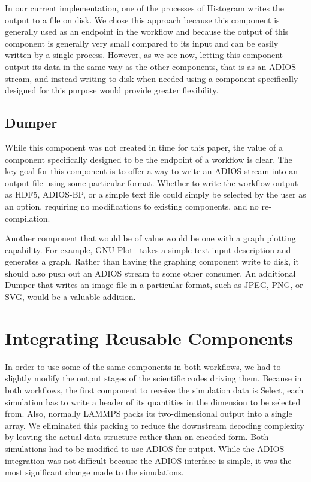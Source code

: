 \documentclass[conference]{IEEEtran}
\begin{document}
In our current implementation, one of the processes of Histogram writes the
output to a file on disk. We chose this approach because this component is
generally used as an endpoint in the workflow and because the output of this
component is generally very small compared to its input and can be easily
written by a single process.
However, as we see now, letting this component output its data in the
same way as the other components, that is as an ADIOS stream, and instead writing to
disk when needed using a component specifically designed for this purpose would
provide greater flexibility.

\subsection{Dumper}

While this component was not created in time for this paper, the value of
a component specifically designed to be the endpoint of a workflow
is clear. The key goal for this component is to offer a way to write an ADIOS stream into an
output file using some particular format. Whether to write the workflow output as
HDF5, ADIOS-BP, or a simple text file could simply be selected by the user as an option,
requiring no modifications to existing components, and no re-compilation.

Another component that would be of value would be one with a graph plotting capability.
For example, GNU
Plot~\cite{racine:2006:gnuplot} takes a simple text input description and
generates a graph.  Rather than having the graphing component write to
disk, it should also push out an ADIOS stream to some other consumer. An
additional Dumper that writes an image file in a particular format, such as
JPEG, PNG, or SVG, would be a valuable addition.

\section{Integrating Reusable Components}
\label{s:integrating-reusable-components}

In order to use some of the same components in both workflows, we had to
slightly modify the output stages of the scientific codes driving them. Because
in both workflows, the first component to receive the simulation data is
Select, each simulation has to write a header of its quantities in the
dimension to be selected from. Also, normally LAMMPS packs its two-dimensional
output into a single array. We eliminated this packing to reduce the downstream
decoding complexity by leaving the actual data structure rather than an encoded
form.
Both simulations had to be
modified to use ADIOS for output. While the ADIOS integration was
not difficult because the ADIOS interface is simple, it was the most
significant change made to the
simulations.
\end{document}
